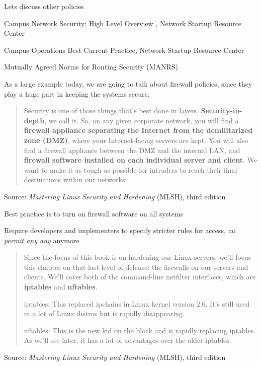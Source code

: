 \documentclass[Screen16to9,17pt]{foils}
\begin{document}
Lets discuss other policies

Campus Network Security: High Level Overview , Network Startup Resource Center

Campus Operations Best Current Practice, Network Startup Resource Center

Mutually Agreed Norms for Routing Security (MANRS)








As a large example today, we are going to talk about firewall policies, since they play a huge part in keeping the systems secure.
\begin{quote}
Security is one of those things that’s best done in layers. {\bf Security-in-depth}, we call it. So, on any given
corporate network, you will find a {\bf firewall appliance separating the Internet from the demilitarized
zone (DMZ)}, where your Internet-facing servers are kept. You will also find a firewall appliance between
the DMZ and the internal LAN, and {\bf firewall software installed on each individual server and client}. We
want to make it as tough as possible for intruders to reach their final destinations within our networks.
\end{quote}
Source: \emph{Mastering Linux Security and Hardening} (MLSH), third edition


\begin{list2}
\item Best practice is to turn on firewall software on all systems
\item Require developers and implementers to specify stricter rules for access, no \emph{permit any any} anymore
\end{list2}




\begin{quote}
Since the focus of this book is on hardening our Linux servers, we’ll focus this chapter on that last
level of defense: the firewalls on our servers and clients. We’ll cover both of the command-line netfilter
interfaces, which are {\bf iptables} and {\bf nftables}.

\begin{list2}
\item iptables: This replaced ipchains in Linux kernel version 2.6. It’s still used in a lot of Linux
distros but is rapidly disappearing.
\item nftables: This is the new kid on the block and is rapidly replacing iptables. As we’ll see later,
it has a lot of advantages over the older iptables.
\end{list2}
\end{quote}
Source: \emph{Mastering Linux Security and Hardening} (MLSH), third edition
\end{document}
